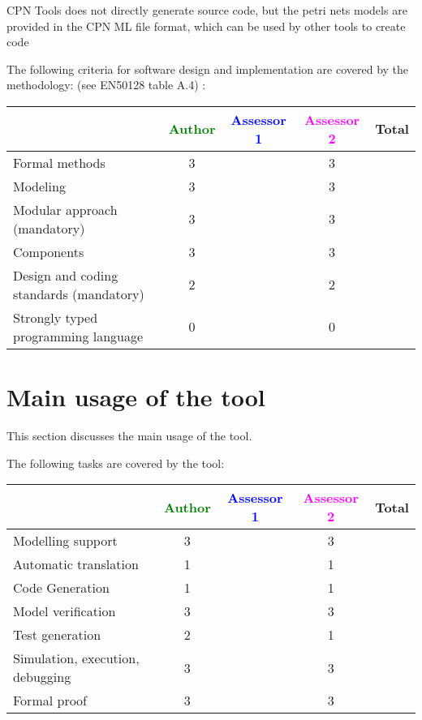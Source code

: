 CPN Tools does not directly generate source code, but the petri nets models are provided in the CPN ML file format, which can be used by other tools to create code

The following criteria for software design and implementation are covered by the methodology:
(see EN50128 table A.4) :

\begin{tabular}{|l | c | c | c | c|}
\hline
& \textcolor{green}{Author} & \textcolor{blue}{Assessor 1} & \textcolor{magenta}{Assessor 2} & Total \\
\hline
Formal methods  & 3 & & 3 &  \\
\hline 
Modeling  & 3 & & 3 &  \\
\hline
Modular approach (mandatory) & 3 & & 3 &  \\
\hline
Components & 3 & & 3 &  \\
\hline
Design and coding standards (mandatory) & 2 & & 2 &  \\
\hline
Strongly typed programming language & 0 & & 0 &  \\
\hline

\end{tabular}



\section{Main usage of the tool}
\label{main_usage}

This section discusses the main usage of the tool.

The following tasks are covered by the tool:


\begin{tabular}{|l | c | c | c | c|}
\hline
& \textcolor{green}{Author} & \textcolor{blue}{Assessor 1} & \textcolor{magenta}{Assessor 2} & Total \\
\hline 
Modelling support & 3 & & 3 &  \\
\hline
Automatic translation  & 1 & & 1 & \\
\hline
Code Generation  & 1 & & 1 & \\
\hline
Model verification & 3 & & 3 & \\
\hline
Test generation & 2 & & 1 & \\
\hline
Simulation, execution, debugging & 3 & & 3 & \\
\hline
Formal proof & 3 & & 3 & \\
\hline
\end{tabular}

